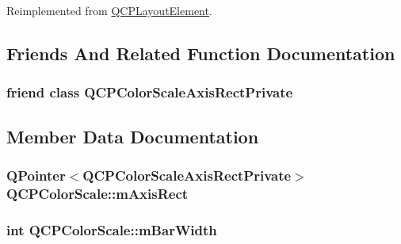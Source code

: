 Reimplemented from \hyperlink{class_q_c_p_layout_element_a300521d2fd18a893c1b85f6be11ce2bf}{Q\+C\+P\+Layout\+Element}.



\subsection{Friends And Related Function Documentation}
\hypertarget{class_q_c_p_color_scale_a1441d8c09d7227c0c29a8d0a96d55bfe}{}
\subsubsection[{Q\+C\+P\+Color\+Scale\+Axis\+Rect\+Private}]{\setlength{\rightskip}{0pt plus 5cm}friend class {\bf Q\+C\+P\+Color\+Scale\+Axis\+Rect\+Private}\hspace{0.3cm}{\ttfamily [friend]}}\label{class_q_c_p_color_scale_a1441d8c09d7227c0c29a8d0a96d55bfe}


\subsection{Member Data Documentation}
\hypertarget{class_q_c_p_color_scale_a6e37f7d49cd614dc50ef1caae60461b9}{}
\subsubsection[{m\+Axis\+Rect}]{\setlength{\rightskip}{0pt plus 5cm}Q\+Pointer$<${\bf Q\+C\+P\+Color\+Scale\+Axis\+Rect\+Private}$>$ Q\+C\+P\+Color\+Scale\+::m\+Axis\+Rect\hspace{0.3cm}{\ttfamily [protected]}}\label{class_q_c_p_color_scale_a6e37f7d49cd614dc50ef1caae60461b9}
\hypertarget{class_q_c_p_color_scale_a409d2ab78dff1f92da5e6acfb062e811}{}
\subsubsection[{m\+Bar\+Width}]{\setlength{\rightskip}{0pt plus 5cm}int Q\+C\+P\+Color\+Scale\+::m\+Bar\+Width\hspace{0.3cm}{\ttfamily [protected]}}\label{class_q_c_p_color_scale_a409d2ab78dff1f92da5e6acfb062e811}
\hypertarget{class_q_c_p_color_scale_a2efbc90fd31898fe05d2b74a8422b1d5}{}
